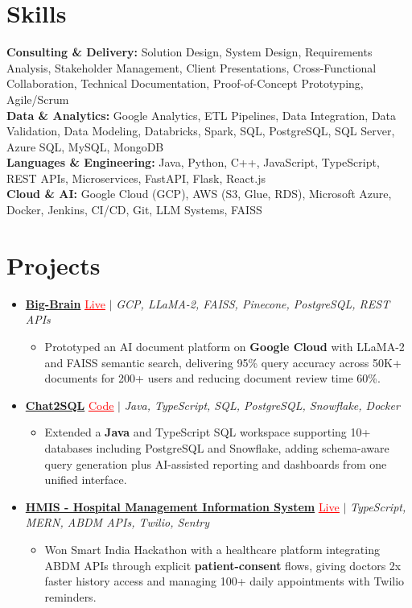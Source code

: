 \documentclass[letterpaper,10pt]{article}
\newcommand{\itemTail}{\vspace{-4pt}}
\newcommand{\sectionGap}{\vspace{-8pt}}
\newcommand{\projGap}{\vspace{3pt}}
\newcommand{\resumeItem}[1]{\item\small{{#1 \itemTail}}}
\newcommand{\resumeProjectHeading}[1]{\item \small #1 \vspace{-2pt}}
\newcommand{\resumeProjectLink}[2]{\href{#1}{\textcolor{red}{\underline{#2}}}}
\newcommand{\resumeSubHeadingListStart}{\begin{itemize}[leftmargin=0.0in, label={}]}
\newcommand{\resumeSubHeadingListEnd}{\end{itemize}}
\newcommand{\resumeProjItemListStart}{\begin{itemize}[leftmargin=0.15in,label=\textbullet,itemsep=3pt,topsep=0pt,parsep=0pt,partopsep=0pt]}
\newcommand{\resumeProjItemListEnd}{\end{itemize}\vspace{-4pt}}
\begin{document}
\section{Skills}
\begin{itemize}[leftmargin=0.15in, label={}]
\small{\item{
\textbf{Consulting \& Delivery:} Solution Design, System Design, Requirements Analysis, Stakeholder Management, Client Presentations, Cross-Functional Collaboration, Technical Documentation, Proof-of-Concept Prototyping, Agile/Scrum \\
\textbf{Data \& Analytics:} Google Analytics, ETL Pipelines, Data Integration, Data Validation, Data Modeling, Databricks, Spark, SQL, PostgreSQL, SQL Server, Azure SQL, MySQL, MongoDB \\
\textbf{Languages \& Engineering:} Java, Python, C++, JavaScript, TypeScript, REST APIs, Microservices, FastAPI, Flask, React.js \\
\textbf{Cloud \& AI:} Google Cloud (GCP), AWS (S3, Glue, RDS), Microsoft Azure, Docker, Jenkins, CI/CD, Git, LLM Systems, FAISS
}}
\end{itemize}
\sectionGap
\section{Projects}
\resumeSubHeadingListStart
\vspace{-2pt}
\resumeProjectHeading{\href{https://big-brain-pied.vercel.app/}{\textbf{Big-Brain}} \resumeProjectLink{https://big-brain-pied.vercel.app/}{Live} $|$ \emph{GCP, LLaMA-2, FAISS, Pinecone, PostgreSQL, REST APIs}}
\resumeProjItemListStart
\resumeItem{Prototyped an AI document platform on \textbf{Google Cloud} with LLaMA-2 and FAISS semantic search, delivering 95\% query accuracy across 50K+ documents for 200+ users and reducing document review time 60\%.}
\resumeProjItemListEnd
\projGap
\resumeProjectHeading{\href{https://github.com/SAHAJ-BHADJA/Chat2SQL}{\textbf{Chat2SQL}} \resumeProjectLink{https://github.com/SAHAJ-BHADJA/Chat2SQL}{Code} $|$ \emph{Java, TypeScript, SQL, PostgreSQL, Snowflake, Docker}}
\resumeProjItemListStart
\resumeItem{Extended a \textbf{Java} and TypeScript SQL workspace supporting 10+ databases including PostgreSQL and Snowflake, adding schema-aware query generation plus AI-assisted reporting and dashboards from one unified interface.}
\resumeProjItemListEnd
\projGap
\resumeProjectHeading{\href{https://hims-rouge.vercel.app/}{\textbf{HMIS - Hospital Management Information System}} \resumeProjectLink{https://hims-rouge.vercel.app/}{Live} $|$ \emph{TypeScript, MERN, ABDM APIs, Twilio, Sentry}}
\resumeProjItemListStart
\resumeItem{Won Smart India Hackathon with a healthcare platform integrating ABDM APIs through explicit \textbf{patient-consent} flows, giving doctors 2x faster history access and managing 100+ daily appointments with Twilio reminders.}
\resumeProjItemListEnd
\resumeSubHeadingListEnd
\end{document}
